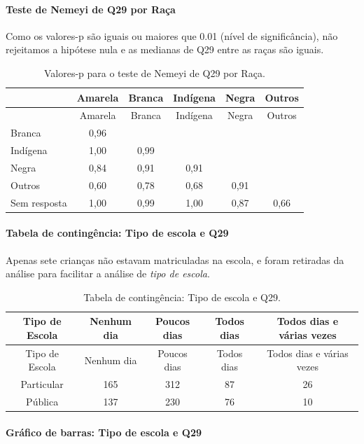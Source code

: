 \documentclass[]{article}
\let\oldparagraph\paragraph
\renewcommand{\paragraph}[1]{\oldparagraph{#1}\mbox{}}
\begin{document}
\hypertarget{teste-de-nemeyi-de-q29-por-rauxe7a}{%
\paragraph{Teste de Nemeyi de Q29 por Raça}\label{teste-de-nemeyi-de-q29-por-rauxe7a}}

Como os valores-p são iguais ou maiores que 0.01 (nível de significância), não rejeitamos a hipótese nula e as medianas de Q29 entre as raças são iguais.

\begin{longtable}[]{@{}lccccc@{}}
\caption{\label{tab:unnamed-chunk-936}Valores-p para o teste de Nemeyi de Q29 por Raça.}\tabularnewline
\toprule
& Amarela & Branca & Indígena & Negra & Outros\tabularnewline
\midrule
\endfirsthead
\toprule
& Amarela & Branca & Indígena & Negra & Outros\tabularnewline
\midrule
\endhead
Branca & 0,96 & & & &\tabularnewline
Indígena & 1,00 & 0,99 & & &\tabularnewline
Negra & 0,84 & 0,91 & 0,91 & &\tabularnewline
Outros & 0,60 & 0,78 & 0,68 & 0,91 &\tabularnewline
Sem resposta & 1,00 & 0,99 & 1,00 & 0,87 & 0,66\tabularnewline
\bottomrule
\end{longtable}

\cleardoublepage

\hypertarget{tabela-de-continguxeancia-tipo-de-escola-e-q29}{%
\paragraph{Tabela de contingência: Tipo de escola e Q29}\label{tabela-de-continguxeancia-tipo-de-escola-e-q29}}

Apenas sete crianças não estavam matriculadas na escola, e foram retiradas da análise para facilitar a análise de \emph{tipo de escola}.

\begin{longtable}[]{@{}ccccc@{}}
\caption{\label{tab:unnamed-chunk-937}Tabela de contingência: Tipo de escola e Q29.}\tabularnewline
\toprule
Tipo de Escola & Nenhum dia & Poucos dias & Todos dias & Todos dias e várias vezes\tabularnewline
\midrule
\endfirsthead
\toprule
Tipo de Escola & Nenhum dia & Poucos dias & Todos dias & Todos dias e várias vezes\tabularnewline
\midrule
\endhead
Particular & 165 & 312 & 87 & 26\tabularnewline
Pública & 137 & 230 & 76 & 10\tabularnewline
\bottomrule
\end{longtable}

\hypertarget{gruxe1fico-de-barras-tipo-de-escola-e-q29}{%
\paragraph{Gráfico de barras: Tipo de escola e Q29}\label{gruxe1fico-de-barras-tipo-de-escola-e-q29}}
\end{document}
